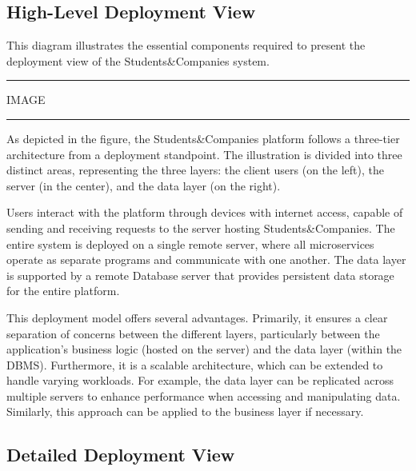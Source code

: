 \subsection{High-Level Deployment View}

This diagram illustrates the essential components required to present the deployment view of the Students\&Companies system.

\vspace{20pt}
\hrule
\vspace{10pt}
IMAGE
\vspace{10pt}
\hrule
\vspace{20pt}

As depicted in the figure, the Students\&Companies platform follows a three-tier architecture from a deployment standpoint. The illustration is divided into three distinct areas, representing the three layers: the client users (on the left), the server (in the center), and the data layer (on the right).

Users interact with the platform through devices with internet access, capable of sending and receiving requests to the server hosting Students\&Companies. The entire system is deployed on a single remote server, where all microservices operate as separate programs and communicate with one another. The data layer is supported by a remote Database server that provides persistent data storage for the entire platform.

This deployment model offers several advantages. Primarily, it ensures a clear separation of concerns between the different layers, particularly between the application’s business logic (hosted on the server) and the data layer (within the DBMS). Furthermore, it is a scalable architecture, which can be extended to handle varying workloads. For example, the data layer can be replicated across multiple servers to enhance performance when accessing and manipulating data. Similarly, this approach can be applied to the business layer if necessary.

\subsection{Detailed Deployment View}


